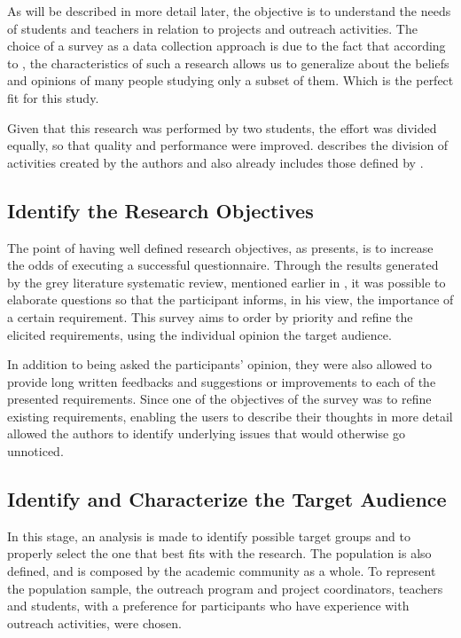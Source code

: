 As will be described in more detail later, the objective is to understand the needs of students and teachers in relation to projects and outreach activities. The choice of a survey as a data collection approach is due to the fact that according to \textcite{kasunic2005designing}, the characteristics of such a research allows us to generalize about the beliefs and opinions of many people studying only a subset of them. Which is the perfect fit for this study.

Given that this research was performed by two students, the effort was divided equally, so that quality and performance were improved.  describes the division of activities created by the authors and also already includes those defined by \textcite{kasunic2005designing}.



\subsection{Identify the Research Objectives}\label{sec:survey-objectives}

The point of having well defined research objectives, as \textcite{kasunic2005designing} presents, is to increase the odds of executing a successful questionnaire. Through the results generated by the grey literature systematic review, mentioned earlier in , it was possible to elaborate questions so that the participant informs, in his view, the importance of a certain requirement. This survey aims to order by priority and refine the elicited requirements, using the individual opinion the target audience.

In addition to being asked the participants' opinion, they were also allowed to provide long written feedbacks and suggestions or improvements to each of the presented requirements. Since one of the objectives of the survey was to refine existing requirements, enabling the users to describe their thoughts in more detail allowed the authors to identify underlying issues that would otherwise go unnoticed.

\subsection{Identify and Characterize the Target Audience}\label{sec:survey-targets}

In this stage, an analysis is made to identify possible target groups and to properly select the one that best fits with the research. The population is also defined, and is composed by the academic community as a whole. To represent the population sample, the outreach program and project coordinators, teachers and students, with a preference for participants who have experience with outreach activities, were chosen.

